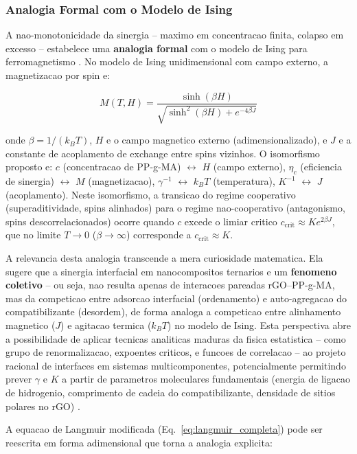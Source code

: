 \documentclass[11pt,a4paper,oneside]{article}
\begin{document}
\subsubsection{Analogia Formal com o Modelo de Ising}\label{sec:ising}

A nao-monotonicidade da sinergia -- maximo em concentracao finita, colapso em excesso -- estabelece uma {\bfseries analogia formal} com o modelo de Ising para ferromagnetismo \cite{Ising1925}. No modelo de Ising unidimensional com campo externo, a magnetizacao por spin e:

\begin{equation}
M(T,H) = \frac{\sinh(\beta H)}{\sqrt{\sinh^2(\beta H) + e^{-4\beta J}}}
\label{eq:ising_m}
\end{equation}

onde $\beta{=}1/(k_BT)$, $H$ e o campo magnetico externo (adimensionalizado), e $J$ e a constante de acoplamento de exchange entre spins vizinhos. O isomorfismo proposto e: $c$ (concentracao de PP-g-MA) $\leftrightarrow$ $H$ (campo externo), $\eta_c$ (eficiencia de sinergia) $\leftrightarrow$ $M$ (magnetizacao), $\gamma^{-1}$ $\leftrightarrow$ $k_BT$ (temperatura), $K^{-1}$ $\leftrightarrow$ $J$ (acoplamento). Neste isomorfismo, a transicao do regime cooperativo (superaditividade, spins alinhados) para o regime nao-cooperativo (antagonismo, spins descorrelacionados) ocorre quando $c$ excede o limiar critico $c_{\text{crit}}{\approx}K e^{2\beta J}$, que no limite $T{\to}0$ ($\beta{\to}\infty$) corresponde a $c_{\text{crit}}{\approx}K$.

A relevancia desta analogia transcende a mera curiosidade matematica. Ela sugere que a sinergia interfacial em nanocompositos ternarios e um {\bfseries fenomeno coletivo} -- ou seja, nao resulta apenas de interacoes pareadas rGO--PP-g-MA, mas da competicao entre adsorcao interfacial (ordenamento) e auto-agregacao do compatibilizante (desordem), de forma analoga a competicao entre alinhamento magnetico ($J$) e agitacao termica ($k_BT$) no modelo de Ising. Esta perspectiva abre a possibilidade de aplicar tecnicas analiticas maduras da fisica estatistica -- como grupo de renormalizacao, expoentes criticos, e funcoes de correlacao -- ao projeto racional de interfaces em sistemas multicomponentes, potencialmente permitindo prever $\gamma$ e $K$ a partir de parametros moleculares fundamentais (energia de ligacao de hidrogenio, comprimento de cadeia do compatibilizante, densidade de sitios polares no rGO) \cite{Ising1925, Potts2011}.

A equacao de Langmuir modificada (Eq.~\ref{eq:langmuir_completa}) pode ser reescrita em forma adimensional que torna a analogia explicita:
\end{document}
